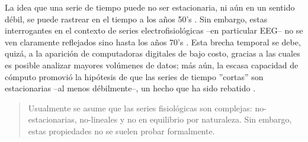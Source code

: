 
La idea que una serie de tiempo puede no ser estacionaria, ni a\'un en un sentido d\'ebil, 
se puede rastrear en el tiempo a los a\~nos 50’s \cite{Page52,Silverman57}. 
Sin embargo, estas interrogantes en el contexto de series electrofisiol\'ogicas --en particular 
EEG-- no se ven claramente reflejados sino hasta los años 70’s 
\cite{Kawabata73,McEwen75,Cohen77,Sugimoto78}.
Esta brecha temporal se debe, quiz\'a, a la aparici\'on de computadoras digitales de bajo costo, 
gracias a las cuales es posible analizar mayores volúmenes de datos; m\'as a\'un, la escasa 
capacidad de c\'omputo promovi\'o la hip\'otesis de que las series de tiempo 
''cortas'' son estacionarias --al menos d\'ebilmente--, un hecho que ha sido 
rebatido \cite{Melard89,Adak98,Klonowski09}.



\begin{quotation}
Usualmente se asume que las series fisiol\'ogicas son complejas:
no-estacionarias, no-lineales y no en equilibrio por naturaleza. Sin embargo, estas propiedades
no se suelen probar formalmente.
\end{quotation}


